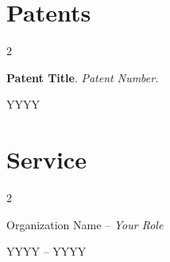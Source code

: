 \documentclass[11pt, letterpaper]{article}
\newenvironment{twocolentry}[2][]{
    \onecolentry
    \def\secondColumn{#2}
    \setcolumnwidth{\fill, 3.75 cm}
    \begin{paracol}{2}
}{
    \switchcolumn \raggedleft \secondColumn
    \end{paracol}
    \endonecolentry
}
\begin{document}
    \section{Patents}
        
        \begin{samepage}
            \begin{twocolentry}{
                YYYY
            }
                \textbf{Patent Title}. {\textit{Patent Number}}.
            \end{twocolentry}
        \end{samepage}

    \section{Service}
        
        \begin{samepage}
            \begin{twocolentry}{
                YYYY – YYYY}
                Organization Name – \textit{Your Role}
            \end{twocolentry}

        \end{samepage}        
\end{document}
